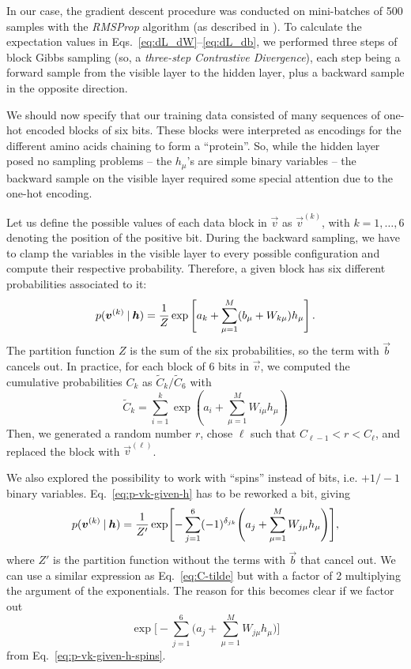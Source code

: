 \documentclass[prl, twocolumn]{revtex4-2}
\begin{document}
In our case, the gradient descent procedure was conducted on mini-batches
of 500 samples with the \emph{RMSProp} algorithm (as described in
\cite{Mehta2019}). To calculate the expectation values in
Eqs.~\eqref{eq:dL_dW}–\eqref{eq:dL_db}, we performed three steps of block
Gibbs sampling (so, a \emph{three-step Contrastive Divergence}), each step
being a forward sample from the visible layer to the hidden layer, plus a
backward sample in the opposite direction.

We should now specify that our training data consisted of many sequences of
one-hot encoded blocks of six bits. These blocks were interpreted as
encodings for the different amino acids chaining to form a “protein”. So,
while the hidden layer posed no sampling problems – the $h_\mu$’s are
simple binary variables – the backward sample on the visible layer required
some special attention due to the one-hot encoding.

Let us define the possible values of each data block in $\vec{v}$ as
$\vec{v}^{(k)}$, with $k = 1, \dots, 6$ denoting the position of the
positive bit. During the backward sampling, we have to clamp the variables
in the visible layer to every possible configuration and compute their
respective probability. Therefore, a given block has six different
probabilities associated to it:
\begin{equation}
    p(\bm{v}^{(k)} \:\vert\: \bm{h}) = \frac{1}{Z} \exp\left[a_k + \sum_{\mu
    = 1}^{M} (b_\mu + W_{k\mu}) h_\mu \right].
    \label{eq:p-vk-given-h}
\end{equation}
The partition function $Z$ is the sum of the six probabilities, so the term
with $\vec{b}$ cancels out. In practice, for each block of 6 bits in
$\vec{v}$, we computed the cumulative probabilities $C_k$ as $\tilde{C}_k /
\tilde{C}_6$ with
\begin{equation}
    \tilde{C}_k = \sum_{i = 1}^{k} \exp\left(a_i + \sum_{\mu = 1}^{M}
    W_{i\mu} h_\mu\right)
    \label{eq:C-tilde}
\end{equation}
Then, we generated a random number $r$, chose $\ell$ such that
$C_{\ell-1}<r<C_\ell$, and replaced the block with $\vec{v}^{(\ell)}$. 

We also explored the possibility to work with “spins” instead of bits, i.e.
$+1/-1$ binary variables. Eq.~\eqref{eq:p-vk-given-h} has to be reworked a
bit, giving
\begin{equation}
    p(\bm{v}^{(k)} \:\vert\: \bm{h}) = \frac{1}{Z'}
    \exp\Biggl[
        - \sum_{j = 1}^{6} (-1)^{\delta_{jk}} \Biggl(a_j + \sum_{\mu =
        1}^{M} W_{j\mu} h_\mu\Biggr)
    \Biggr],
    \label{eq:p-vk-given-h-spins}
\end{equation}
where $Z'$ is the partition function without the terms with $\vec{b}$ that
cancel out. We can use a similar expression as Eq.~\eqref{eq:C-tilde} but
with a factor of 2 multiplying the argument of the exponentials. The reason
for this becomes clear if we factor out
\begin{equation}
    \exp\Biggl[-\sum_{j = 1}^{6} \Biggl(a_j + \sum_{\mu = 1}^{M} W_{j\mu}
    h_\mu\Biggr)\Biggr]
\end{equation}
from Eq.~\eqref{eq:p-vk-given-h-spins}.
\end{document}

